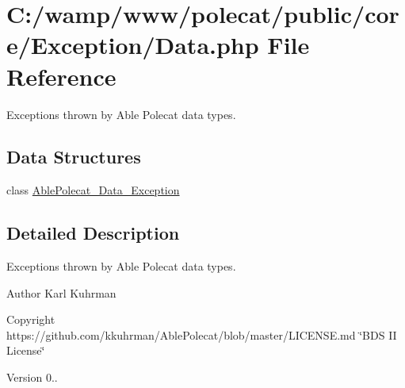 \hypertarget{_exception_2_data_8php}{}\section{C\+:/wamp/www/polecat/public/core/\+Exception/\+Data.php File Reference}
\label{_exception_2_data_8php}


Exceptions thrown by Able Polecat data types.  


\subsection*{Data Structures}
\begin{DoxyCompactItemize}
\item 
class \hyperlink{class_able_polecat___data___exception}{Able\+Polecat\+\_\+\+Data\+\_\+\+Exception}
\end{DoxyCompactItemize}


\subsection{Detailed Description}
Exceptions thrown by Able Polecat data types. 

\begin{DoxyAuthor}{Author}
Karl Kuhrman 
\end{DoxyAuthor}
\begin{DoxyCopyright}{Copyright}
https\+://github.com/kkuhrman/\+Able\+Polecat/blob/master/\+L\+I\+C\+E\+N\+S\+E.\+md \char`\"{}\+B\+D\+S I\+I License\char`\"{} 
\end{DoxyCopyright}
\begin{DoxyVersion}{Version}
0.. 
\end{DoxyVersion}
